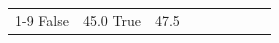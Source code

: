 \begin{table}[H]
\begin{tabular}{lllrlllll}
\cline{1-9}
False & 45.0%
\cline{1-9}
True & 47.5%

\end{tabular}
\end{table}
